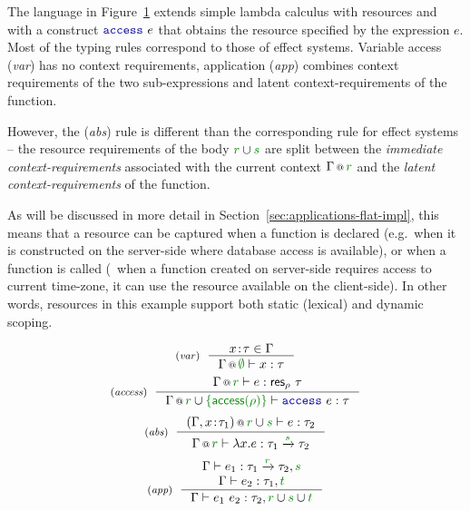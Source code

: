 The language in Figure~\ref{fig:path-coeff} extends simple lambda calculus with resources and
with a construct $\kvd{access}~e$ that obtains the resource specified by the expression $e$.
Most of the typing rules correspond to those of effect systems. Variable access (\emph{var}) 
has no context requirements, application (\emph{app}) combines context requirements of the two
sub-expressions and latent context-requirements of the function. 

However, the (\emph{abs}) rule is different than the corresponding rule for effect systems -- the
resource requirements of the body $\cclrd{r} \cup \cclrd{s}$ are split between the \emph{immediate 
context-requirements} associated with the current context $\coctx{\Gamma}{\cclrd{r}}$ and the 
\emph{latent context-requirements} of the function.

As will be discussed in more detail in Section~\ref{sec:applications-flat-impl}, this means that a 
resource can be captured when a function is declared (e.g.~when it is constructed on the 
server-side where database access is available), or when a function is called (\eg~when a function 
created on server-side requires access to current time-zone, it can use the resource available on
 the client-side). In other words, resources in this example support both static (lexical) and
 dynamic scoping.


\begin{figure}[t]
\begin{equation*}
\tyrule{var}
  {x\!:\!\tau \in \Gamma }
  {\coctx{\Gamma}{\cclrd{\emptyset}} \vdash x : \tau }
\end{equation*} 
\begin{equation*}
\tyrule{access}
  {\coctx{\Gamma}{\cclrd{r}} \vdash e : \ident{res}_\rho~\tau }
  {\coctx{\Gamma}{\cclrd{r} \cup \cclrd{ \{\ident{access}(\rho)\} }} \vdash \kvd{access}~e : \tau }
\end{equation*}
\begin{equation*}
\tyrule{abs}
  {\coctx{(\Gamma, x\!:\!\tau_1)}{\cclrd{r} \cup \cclrd{s}} \vdash e : \tau_2 }
  {\coctx{\Gamma}{\cclrd{r}} \vdash \lambda x.e : \tau_1 \xrightarrow{\cclrd{s}} \tau_2}
\end{equation*}
\begin{equation*}
\tyrule{app}
  {\Gamma \vdash e_1 : \tau_1 \xrightarrow{\cclrd{r}} \tau_2, \cclrd{s} \\
   \Gamma \vdash e_2 : \tau_1, \cclrd{t} }
  {\Gamma \vdash e_1~e_2 : \tau_2, \cclrd{r}\cup\cclrd{s}\cup\cclrd{t}  }
\end{equation*}

\label{fig:path-coeff}
\end{figure}

